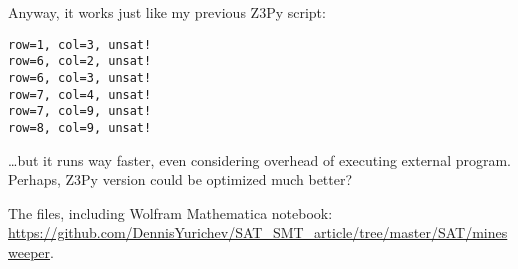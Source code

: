 Anyway, it works just like my previous Z3Py script:

\begin{lstlisting}
row=1, col=3, unsat!
row=6, col=2, unsat!
row=6, col=3, unsat!
row=7, col=4, unsat!
row=7, col=9, unsat!
row=8, col=9, unsat!
\end{lstlisting}

\dots but it runs way faster, even considering overhead of executing external program.
Perhaps, Z3Py version could be optimized much better?

The files, including Wolfram Mathematica notebook: \url{https://github.com/DennisYurichev/SAT_SMT_article/tree/master/SAT/minesweeper}.


